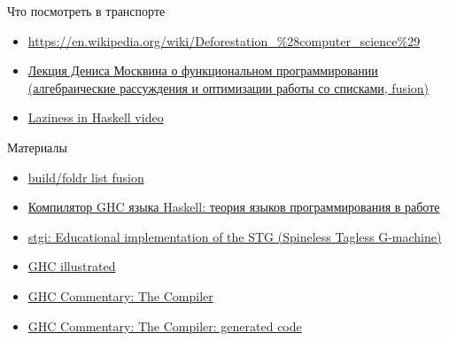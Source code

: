 
    \begin{frame}{Что посмотреть в транспорте}
        \begin{itemize}
            \item {\color{blue}\url{https://en.wikipedia.org/wiki/Deforestation\_\%28computer\_science\%29}}
            \item \href{https://youtu.be/d3lYx13kdWU?si=ctrQy6pm_44aOgmR}{\color{blue} Лекция Дениса Москвина о функциональном программировании (алгебраические рассуждения и оптимизации работы со списками, fusion)}
            \item \href{https://www.youtube.com/watch?v=fSqE-HSh_NU&list=PLyzwHTVJlRc8620PjqbM0x435-6-Gi1Gu}{\color{blue}Laziness in Haskell video}
        \end{itemize}
    \end{frame}

    \begin{frame}{Материалы}
        \begin{itemize}
            \item \href{https://wiki.haskell.org/GHC\_optimisations\#Fusion}{\color{blue} build/foldr list fusion}
            \item \href{https://www.lektorium.tv/node/32421}{\color{blue} Компилятор GHC языка Haskell: теория языков программирования в работе}
            \item \href{https://hackage.haskell.org/package/stgi}{\color{blue} stgi: Educational implementation of the STG (Spineless Tagless G-machine)}
            \item \href{https://takenobu-hs.github.io/downloads/haskell_ghc_illustrated.pdf}{\color{blue} GHC illustrated}
            \item \href{https://gitlab.haskell.org/ghc/ghc/-/wikis/commentary/compiler/}{\color{blue} GHC Commentary: The Compiler}
            \item \href{https://gitlab.haskell.org/ghc/ghc/-/wikis/commentary/compiler/generated-code}{\color{blue} GHC Commentary: The Compiler: generated code}
        \end{itemize}
    \end{frame}


